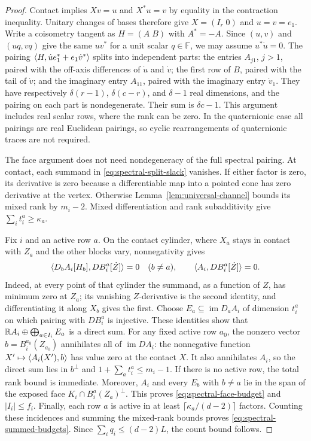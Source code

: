 \begin{proof}
Contact implies $Xv=u$ and $X^*u=v$ by equality in the contraction
inequality.  Unitary changes of bases therefore give
$X=(I_r\;0)$ and $u=v=e_1$.  Write a coisometry tangent as
$H=(A\;B)$ with $A^*=-A$.
Since $(u,v)$ and $(uq,vq)$ give the same $uv^*$ for a unit scalar
$q\in\mathbb F$, we may assume $u^*\dot u=0$.  The pairing
$\langle H,\dot u e_1^*+e_1\dot v^*\rangle$ splits into independent parts: the
entries $A_{j1}$,
$j>1$, paired with the off-axis differences of $\dot u$ and $\dot v$;
the first row of $B$, paired with the tail of $\dot v$; and the imaginary
entry $A_{11}$, paired with the imaginary entry $\dot v_1$.
They have respectively $\delta(r-1)$, $\delta(c-r)$, and $\delta-1$
real dimensions, and the pairing on each part is nondegenerate.
Their sum is $\delta c-1$.  This argument includes real scalar rows,
where the rank can be zero.  In the quaternionic case all pairings are
real Euclidean pairings, so cyclic rearrangements of quaternionic traces
are not required.

The face argument does not need nondegeneracy of the full
spectral pairing.  At contact, each summand in
\eqref{eq:spectral-split-slack} vanishes.  If either factor is zero,
its derivative is zero because a differentiable map into a pointed cone
has zero derivative at the vertex.  Otherwise
Lemma~\ref{lem:universal-channel} bounds its mixed rank by $m_i-2$.  Mixed differentiation and rank
subadditivity give $\sum_i t_i^a\geq\kappa_a$.

Fix $i$ and an active row $a$.  On the contact cylinder, where $X_a$
stays in contact with $Z_a$ and the other blocks vary,
nonnegativity gives
\[
 \langle D_bA_i[H_b],DB_i^a[\dot Z]\rangle=0\quad(b\ne a),
 \qquad \langle A_i,DB_i^a[\dot Z]\rangle=0.
\]
Indeed, at every point of that cylinder the summand, as a function of
$Z$, has minimum zero at $Z_a$; its vanishing $Z$-derivative is the
second identity, and differentiating it along $X_b$ gives the first.
Choose $E_a\subseteq\operatorname{im}D_aA_i$ of dimension $t_i^a$
on which pairing with $DB_i^a$ is injective.  These identities show that
$\mathbb R A_i\oplus\bigoplus_{a\in I_i}E_a$ is a direct sum. For any
fixed active row $a_0$, the nonzero vector $b=B_i^{a_0}(Z_{a_0})$
annihilates all of $\operatorname{im}DA_i$: the nonnegative function
$X'\mapsto\langle A_i(X'),b\rangle$ has value zero at the contact $X$.
It also annihilates $A_i$, so the direct sum lies in $b^\perp$ and
$1+\sum_a t_i^a\leq m_i-1$. If there is no active row, the total
rank bound is immediate. Moreover,
$A_i$ and every $E_b$ with $b\ne a$ lie in the span of the exposed face
$K_i\cap B_i^a(Z_a)^\perp$.  This proves
\eqref{eq:spectral-face-budget} and $|I_i|\leq f_i$.
Finally, each row $a$ is active in at least
$\lceil\kappa_a/(d-2)\rceil$ factors. Counting these incidences and summing the mixed-rank
bounds proves \eqref{eq:spectral-summed-budgets}. Since
$\sum_iq_i\leq(d-2)L$, the count bound follows.
\end{proof}


